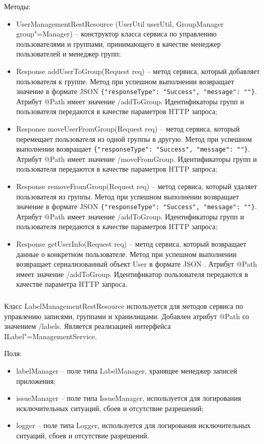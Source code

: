 Методы:
\begin{itemize}
  \item UserManagementRestResource (UserUtil userUtil, GroupManager group"=Manager) – конструктор класса сервиса по управлению пользователями и группами, принимающего в качестве менеджер пользователей и менеджер групп;
  \item Response addUserToGroup(Request req) – метод сервиса, который добавляет пользователя к группе. Метод при успешном выполнении возвращает значение в формате JSON \lstinline!{"responseType": "Success", "message": ""}!.\\ Атрибут @Path имеет значение /addToGroup. Идентификаторы групп и пользователя передаются в качестве параметров HTTP запроса;
  \item Response moveUserFromGroup(Request req) – метод сервиса, который перемещает пользователя из одной группы в другую. Метод при успешном выполнении возвращает \lstinline!{"responseType": "Success", "message": ""}!. Атрибут @Path имеет значение /moveFromGroup. Идентификаторы групп и пользователя передаются в качестве параметров HTTP запроса;
  \item Response removeFromGroup(Request req) – метод сервиса, который удаляет пользователя из группы. Метод при успешном выполнении возвращает значение в формате JSON \lstinline!{"responseType": "Success", "message": ""}!. Атрибут @Path имеет значение /addToGroup. Идентификаторы групп и пользователя передаются в качестве параметров HTTP запроса;
  \item Response getUserInfo(Request req) – метод сервиса, который возвращает данные о конкретном пользователе. Метод при успешном выполнении возвращает сериализованный объект User в формате JSON . Атрибут @Path имеет значение /addToGroup. Идентификатор пользователя передаются в качестве параметра HTTP запроса.
\end{itemize}

\subsubsection{}
\label{sub:arch_and_mod:application_server_layer:label_management_rest_resource}

Класс LabelManagementRestResource используется для методов сервиса по управлению записями, группами и хранилищами. Добавлен атрибут @Path со значением /labels. Является реализацией интерфейса ILabel"=ManagementService.

Поля:
\begin{itemize}
  \item labelManager – поле типа LabelManager, хранящее менеджер записей приложения;
  \item issueManager – поле типа IssueManager, используется для логирования исключительных ситуаций, сбоев и отсутствие разрешений;
  \item logger – поле типа Logger, используется для логирования исключительных ситуаций, сбоев и отсутствие разрешений.
\end{itemize}

